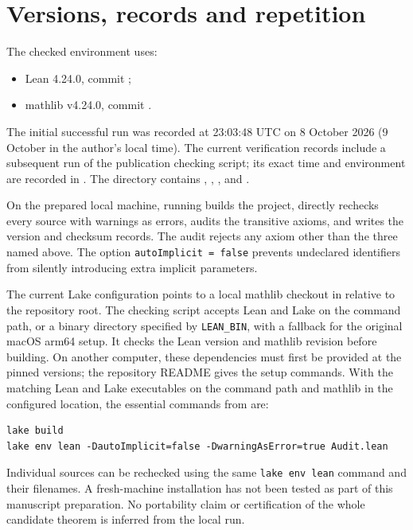 \documentclass[11pt,a4paper]{article}
\begin{document}
\section{Versions, records and repetition}
The checked environment uses:
\begin{itemize}
\item Lean 4.24.0, commit
      ;
\item mathlib v4.24.0, commit
      .
\end{itemize}
The initial successful run was recorded at 23:03:48 UTC on 8 October 2026
(9 October in the author's local time). The current verification records
include a subsequent run of the publication checking script; its exact
time and environment are recorded in .
The directory  contains
, , ,
 and .

On the prepared local machine, running 
builds the project, directly rechecks every source with warnings as errors,
audits the transitive axioms, and writes the version and checksum records.
The audit rejects any axiom other than the three named above.
The option \texttt{autoImplicit = false} prevents undeclared identifiers
from silently introducing extra implicit parameters.

The current Lake configuration points to a local mathlib checkout in
 relative to the repository root. The checking script
accepts Lean and Lake on the command path, or a binary directory specified
by \texttt{LEAN\_BIN}, with a fallback for the original macOS arm64 setup.
It checks the Lean version and mathlib revision before building.
On another computer, these dependencies must first be provided at the
pinned versions; the repository README gives the setup commands.
With the matching Lean and Lake executables on the command path and
mathlib in the configured location, the essential commands from
 are:
{\small\begin{verbatim}
lake build
lake env lean -DautoImplicit=false -DwarningAsError=true Audit.lean
\end{verbatim}}
Individual sources can be rechecked using the same \texttt{lake env lean}
command and their filenames. A fresh-machine installation has not been
tested as part of this manuscript preparation. No portability claim or
certification of the whole candidate theorem is inferred from the local run.
\end{document}

